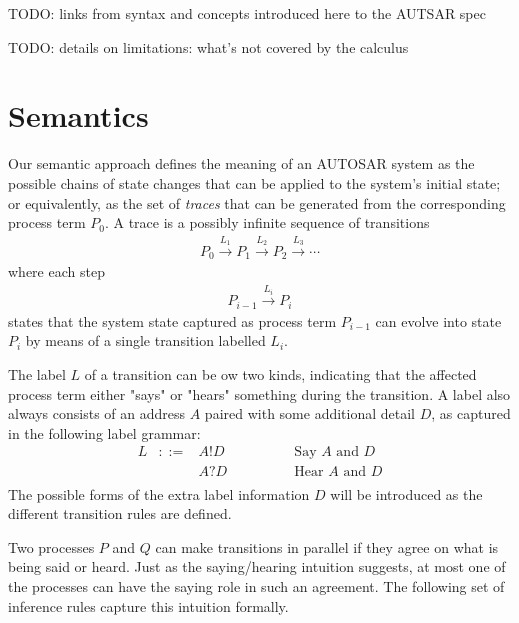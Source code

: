 \documentclass[twocolumn]{article}
\newcommand{\red}[1]{\xrightarrow{#1}}
\begin{document}
TODO: links from syntax and concepts introduced here to the AUTSAR spec

TODO: details on limitations: what's not covered by the calculus

\section{Semantics}
\label{sec:Sem}

Our semantic approach defines the meaning of an AUTOSAR system as the possible chains of state changes that can be applied to the system's initial state; or equivalently, as the set of {\em traces} that can be generated from the corresponding process term $P_0$. A trace is a possibly infinite sequence of transitions
$$
\begin{array}{c}
	P_0 \red{L_1} P_1 \red{L_2} P_2 \red{L_3} \cdots
\end{array}
$$
where each step
$$
\begin{array}{c}
	P_{i-1} \red{L_i} P_i
\end{array}
$$
states that the system state captured as process term $P_{i-1}$ can evolve into state $P_i$ by means of a single transition labelled $L_i$.


The label $L$ of a transition can be ow two kinds, indicating that the affected process term either "says" or "hears" something during the transition. A label also always consists of an address $A$ paired with some additional detail $D$, as captured in the following label grammar:
$$
\begin{array}{rcll}
	L	& ::=		& A!D		& \hspace{4em}\mbox{Say $A$ and $D$} \\
		&		& A?D		& \hspace{4em}\mbox{Hear $A$ and $D$} \\
\end{array}
$$
The possible forms of the extra label information $D$ will be introduced as the different transition rules are defined.

Two processes $P$ and $Q$ can make transitions in parallel if they agree on what is being said or heard. Just as the saying/hearing intuition suggests, at most one of the processes can have the saying role in such an agreement. The following set of inference rules capture this intuition formally.
\end{document}
